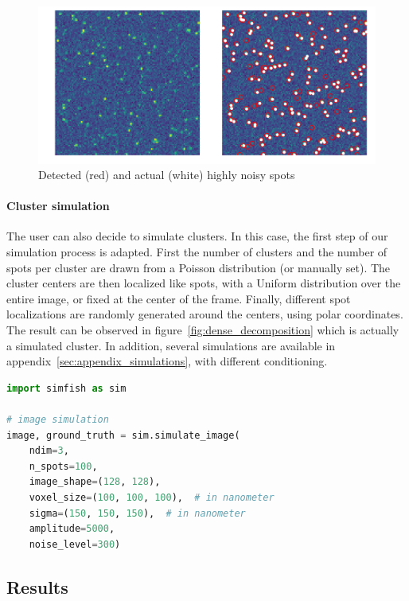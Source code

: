 \begin{figure}[h]
    \centering
    \includegraphics[width=1\textwidth]{figures/chapter2/plot_spot_detection}
    \caption{Detected (red) and actual (white) highly noisy spots}
    \label{fig:spot_detection_high_noise}
\end{figure}

\paragraph{Cluster simulation}

The user can also decide to simulate clusters.
In this case, the first step of our simulation process is adapted.
First the number of clusters and the number of spots per cluster are drawn from a Poisson distribution (or manually set).
The cluster centers are then localized like spots, with a Uniform distribution over the entire image, or fixed at the center of the frame.
Finally, different spot localizations are randomly generated around the centers, using polar coordinates.
The result can be observed in figure~\ref{fig:dense_decomposition} which is actually a simulated cluster.
In addition, several simulations are available in appendix~\ref{sec:appendix_simulations}, with different conditioning.\\

\begin{minipage}{0.9\textwidth}
\begin{lstlisting}[language=Python]
import simfish as sim

# image simulation
image, ground_truth = sim.simulate_image(
	ndim=3,
	n_spots=100,
	image_shape=(128, 128),
	voxel_size=(100, 100, 100),  # in nanometer
	sigma=(150, 150, 150),  # in nanometer
	amplitude=5000,
	noise_level=300)
\end{lstlisting}
\end{minipage}

\subsection{Results} \label{subsec:detection_results}

